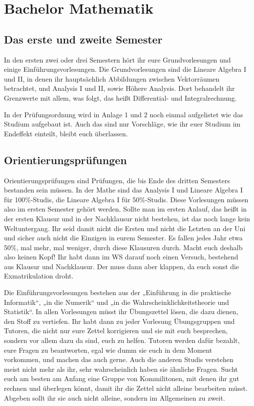 \section{Bachelor Mathematik}


\subsection{Das erste und zweite Semester}

In den ersten zwei oder drei Semestern hört ihr eure Grundvorlesungen und
einige Einführungsvorlesungen. Die Grundvorlesungen sind die Lineare Algebra I
und II, in denen ihr hauptsächlich Abbildungen zwischen Vektorräumen
betrachtet, und Analysis I und II, sowie Höhere Analysis. Dort behandelt ihr
Grenzwerte mit allem, was folgt, das heißt Differential- und Integralrechnung.

In der Prüfungsordnung wird in Anlage 1 und 2 noch einmal aufgelistet wie das
Studium aufgebaut ist. Auch das sind nur Vorschläge, wie ihr euer Studium im
Endeffekt einteilt, bleibt euch überlassen.

\subsection{Orientierungsprüfungen}

Orientierungsprüfungen sind Prüfungen, die bis Ende des dritten Semesters
bestanden sein müssen. In der Mathe sind das Analysis I und Lineare Algebra I
für 100\%-Studis, die Lineare Algebra I für 50\%-Studis.  Diese Vorlesungen
müssen also im ersten Semester gehört werden.  Sollte man im ersten Anlauf, das
heißt in der ersten Klausur und in der Nachklausur nicht bestehen, ist das noch
lange kein Weltuntergang. Ihr seid damit nicht die Ersten und nicht die Letzten
an der Uni und sicher auch nicht die Einzigen in eurem Semester.  Es fallen
jedes Jahr etwa 50\%, mal mehr, mal weniger, durch diese Klausuren durch. Macht
euch deshalb also keinen Kopf! Ihr habt dann im WS darauf noch einen Versuch,
bestehend aus Klausur und Nachklausur. Der muss dann aber klappen, da euch
sonst die Exmatrikulation droht.

Die Einführungsvorlesungen bestehen aus der „Einführung in die praktische
Informatik“, „in die Numerik“ und „in die Wahrscheinklichkeitstheorie und
Statistik“.  In allen Vorlesungen müsst ihr Übungszettel lösen, die dazu dienen,
den Stoff zu vertiefen.  Ihr habt dann zu jeder Vorlesung Übungsgruppen und
Tutoren, die nicht nur eure Zettel korrigieren und sie mit euch
besprechen, sondern vor allem dazu da sind, euch zu helfen.  Tutoren werden
dafür bezahlt, eure Fragen zu beantworten, egal wie dumm sie euch in dem Moment
vorkommen, und machen das auch gerne.  Auch die anderen Studis verstehen meist
nicht mehr als ihr, sehr wahrscheinlich haben sie ähnliche Fragen.  Sucht euch
am besten am Anfang eine Gruppe von Kommilitonen, mit denen ihr gut rechnen und
überlegen könnt, damit ihr die Zettel nicht alleine bearbeiten müsst.  Abgeben
sollt ihr sie auch nicht alleine, sondern im Allgemeinen zu zweit.

